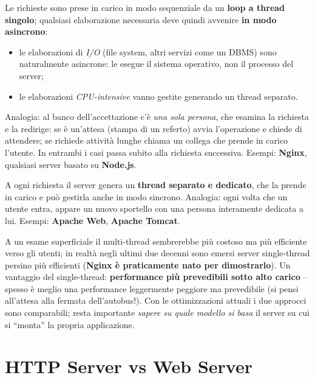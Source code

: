 \begin{importante}
Le richieste sono prese in carico in modo sequenziale da un \textbf{loop a thread singolo};
qualsiasi elaborazione necessaria deve quindi avvenire \textbf{in modo asincrono}:
\begin{itemize}
  \item le elaborazioni di \emph{I/O} (file system, altri servizi come un DBMS) sono
        naturalmente asincrone: le esegue il sistema operativo, non il processo del server;
  \item le elaborazioni \emph{CPU-intensive} vanno gestite generando un thread separato.
\end{itemize}
Analogia: al banco dell'accettazione c'\`e \emph{una sola persona}, che esamina la richiesta
e la redirige: se \`e un'attesa (stampa di un referto) avvia l'operazione e chiede di
attendere; se richiede attivit\`a lunghe chiama un collega che prende in carico l'utente. In
entrambi i casi passa subito alla richiesta successiva.
Esempi: \textbf{Nginx}, qualsiasi server basato su \textbf{Node.js}.
\end{importante}

\begin{importante}
A ogni richiesta il server genera un \textbf{thread separato e dedicato}, che la prende in
carico e pu\`o gestirla anche in modo sincrono. Analogia: ogni volta che un utente entra,
appare un nuovo sportello con una persona interamente dedicata a lui.
Esempi: \textbf{Apache Web}, \textbf{Apache Tomcat}.
\end{importante}

A un esame superficiale il multi-thread sembrerebbe pi\`u costoso ma pi\`u efficiente verso
gli utenti; in realt\`a negli ultimi due decenni sono emersi server single-thread persino
pi\`u efficienti (\textbf{Nginx \`e praticamente nato per dimostrarlo}). Un vantaggio del
single-thread: \textbf{performance pi\`u prevedibili sotto alto carico} -- spesso \`e meglio
una performance leggermente peggiore ma prevedibile (si pensi all'attesa alla fermata
dell'autobus!). Con le ottimizzazioni attuali i due approcci sono comparabili; resta
importante \emph{sapere su quale modello si basa} il server su cui si ``monta'' la propria
applicazione.

\section{HTTP Server vs Web Server}

